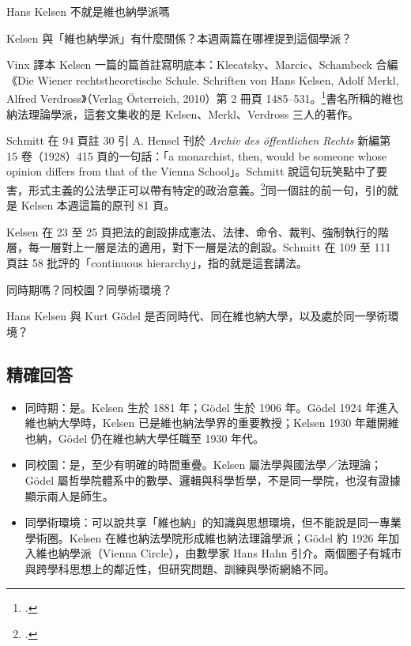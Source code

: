

\begin{qaprompt}
Hans Kelsen 不就是維也納學派嗎
\end{qaprompt}

\begin{qaquestion}
Kelsen 與「維也納學派」有什麼關係？本週兩篇在哪裡提到這個學派？
\end{qaquestion}

Vinx 譯本 Kelsen 一篇的篇首註寫明底本：Klecatsky、Marcic、Schambeck 合編《Die Wiener rechtstheoretische Schule. Schriften von Hans Kelsen, Adolf Merkl, Alfred Verdross》（Verlag Österreich, 2010）第 2 冊頁 1485--531。\footcite[22]{kelsen2015}書名所稱的維也納法理論學派，這套文集收的是 Kelsen、Merkl、Verdross 三人的著作。

Schmitt 在 94 頁註 30 引 A. Hensel 刊於 \emph{Archiv des öffentlichen Rechts} 新編第 15 卷（1928）415 頁的一句話：「a monarchist, then, would be someone whose opinion differs from that of the Vienna School」。Schmitt 說這句玩笑點中了要害，形式主義的公法學正可以帶有特定的政治意義。\footcite[94--95]{schmitt2015}同一個註的前一句，引的就是 Kelsen 本週這篇的原刊 81 頁。

Kelsen 在 23 至 25 頁把法的創設排成憲法、法律、命令、裁判、強制執行的階層，每一層對上一層是法的適用，對下一層是法的創設。Schmitt 在 109 至 111 頁註 58 批評的「continuous hierarchy」，指的就是這套講法。


\begin{qaprompt}
同時期嗎？同校園？同學術環境？
\end{qaprompt}

\begin{qaquestion}
Hans Kelsen 與 Kurt Gödel 是否同時代、同在維也納大學，以及處於同一學術環境？
\end{qaquestion}

\subsection{精確回答}

\begin{itemize}
\tightlist
\item
  同時期：是。Kelsen 生於 1881 年；Gödel 生於 1906 年。Gödel 1924 年進入維也納大學時，Kelsen 已是維也納法學界的重要教授；Kelsen 1930 年離開維也納，Gödel 仍在維也納大學任職至 1930 年代。
\item
  同校園：是，至少有明確的時間重疊。Kelsen 屬法學與國法學／法理論；Gödel 屬哲學院體系中的數學、邏輯與科學哲學，不是同一學院，也沒有證據顯示兩人是師生。
\item
  同學術環境：可以說共享「維也納」的知識與思想環境，但不能說是同一專業學術圈。Kelsen 在維也納法學院形成維也納法理論學派；Gödel 約 1926 年加入維也納學派（Vienna Circle），由數學家 Hans Hahn 引介。兩個圈子有城市與跨學科思想上的鄰近性，但研究問題、訓練與學術網絡不同。
\end{itemize}

